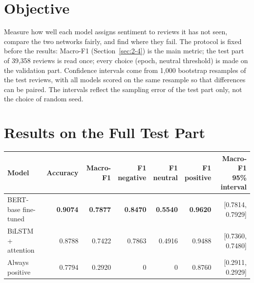 \section{Objective}
\label{sec:7-1}

Measure how well each model assigns sentiment to reviews it has not seen, compare the two networks fairly, and find where they fail. The protocol is fixed before the results: Macro-F1 (Section~\ref{sec:2-4}) is the main metric; the test part of 39{,}358 reviews is read once; every choice (epoch, neutral threshold) is made on the validation part. Confidence intervals come from 1{,}000 bootstrap resamples of the test reviews, with all models scored on the same resample so that differences can be paired. The intervals reflect the sampling error of the test part only, not the choice of random seed.

\section{Results on the Full Test Part}
\label{sec:7-2}

\begin{center}
\small
\begin{tabular}{@{}lrrrrrr@{}}
    \toprule
    Model & Accuracy & Macro-F1 & \shortstack[r]{F1\\negative} & \shortstack[r]{F1\\neutral} & \shortstack[r]{F1\\positive} & \shortstack[r]{Macro-F1\\95\% interval} \\
    \midrule
    BERT-base fine-tuned & \textbf{0.9074} & \textbf{0.7877} & \textbf{0.8470} & \textbf{0.5540} & \textbf{0.9620} & [0.7814, 0.7929] \\
    BiLSTM + attention & 0.8788 & 0.7422 & 0.7863 & 0.4916 & 0.9488 & [0.7360, 0.7480] \\
    Always positive & 0.7794 & 0.2920 & 0 & 0 & 0.8760 & [0.2911, 0.2929] \\
    \bottomrule
\end{tabular}
\end{center}

\begin{center}
\end{center}

